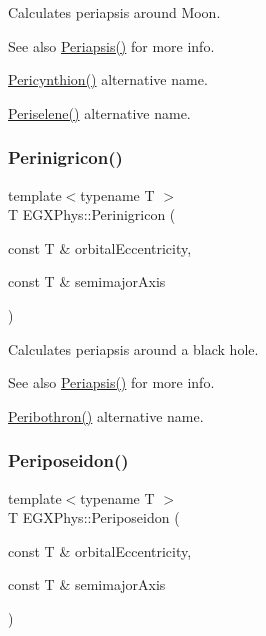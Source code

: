 Calculates periapsis around Moon. 

\begin{DoxySeeAlso}{See also}
\mbox{\hyperlink{group___e_g_x_phys-_periapsis_ga4414ac75539371ec874a3d25cad6c9fe}{Periapsis()}} for more info. 

\mbox{\hyperlink{group___e_g_x_phys-_periapsis_gaeeba153b188cd06cbd233eaef12f0a6a}{Pericynthion()}} alternative name. 

\mbox{\hyperlink{group___e_g_x_phys-_periapsis_ga255874374dde571531e443cdbef9ef0c}{Periselene()}} alternative name. 
\end{DoxySeeAlso}
\mbox{\label{group___e_g_x_phys-_periapsis_ga99d86af90179994e17158b082c502fd4}} 
\subsubsection{\texorpdfstring{Perinigricon()}{Perinigricon()}}
{\footnotesize\ttfamily template$<$typename T $>$ \\
T E\+G\+X\+Phys\+::\+Perinigricon (\begin{DoxyParamCaption}\item[{const T \&}]{orbital\+Eccentricity,  }\item[{const T \&}]{semimajor\+Axis }\end{DoxyParamCaption})}



Calculates periapsis around a black hole. 

\begin{DoxySeeAlso}{See also}
\mbox{\hyperlink{group___e_g_x_phys-_periapsis_ga4414ac75539371ec874a3d25cad6c9fe}{Periapsis()}} for more info. 

\mbox{\hyperlink{group___e_g_x_phys-_periapsis_gada5892309279a3a687c4eb2f88238e4e}{Peribothron()}} alternative name. 
\end{DoxySeeAlso}
\mbox{\label{group___e_g_x_phys-_periapsis_ga237e7af3794202c67e65f64f4c8abc2a}} 
\subsubsection{\texorpdfstring{Periposeidon()}{Periposeidon()}}
{\footnotesize\ttfamily template$<$typename T $>$ \\
T E\+G\+X\+Phys\+::\+Periposeidon (\begin{DoxyParamCaption}\item[{const T \&}]{orbital\+Eccentricity,  }\item[{const T \&}]{semimajor\+Axis }\end{DoxyParamCaption})}



